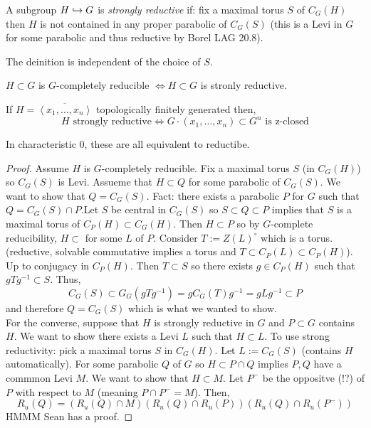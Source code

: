 \documentclass[12pt]{article}
\begin{document}
\begin{defn}
A subgroup $H \hookrightarrow G$ is \textit{strongly reductive} if: fix a maximal torus $S$ of $C_G(H)$ then $H$ is not contained in any proper parabolic of $C_G(S)$ (this is a Levi in $G$ for some parabolic and thus reductive by Borel LAG 20.8). 
\end{defn}

\begin{rmk}
The deinition is independent of the choice of $S$.
\end{rmk}

\begin{prop}
$H \subset G$ is $G$-completely reducible $\iff H \subset G$ is stronly reductive.
\end{prop}

If $H = \overline{\left< x_1, \dots, x_n \right>}$ topologically finitely generated then,
\[ H \text{ strongly reductive} \iff G \cdot (x_1, \dots, x_n) \subset G^n \text{ is z-closed} \]
\begin{rmk}
In characteristic $0$, these are all equivalent to reductibe. 
\end{rmk}

\begin{proof}
Assume $H$ is $G$-completely reducible. Fix a maximal torus $S$ (in $C_G(H)$) so $C_G(S)$ is Levi. Assueme that $H \subset Q$ for some parabolic of $C_G(S)$. We want to show that $Q = C_G(S)$. Fact: there exists a parabolic $P$ for $G$ such that $Q = C_G(S) \cap P$.Let $S$ be central in $C_G(S)$ so $S \subset Q \subset P$ implies that $S$ is a maximal torus of $C_P(H) \subset C_G(H)$. Then $H \subset P$ so by $G$-complete reducibility, $H \subset $ for some $L$ of $P$. Consider $T := Z(L)^\circ$ which is a torus. (reductive, solvable commutative implies a torus and $T \subset C_P(L) \subset C_P(H)$). Up to conjugacy in $C_P(H)$. Then $T \subset S$ so there exists $g \in C_P(H)$ such that $g T g^{-1} \subset S$. Thus,
\[ C_G(S) \subset G_G(g T g^{-1}) = g C_G(T) g^{-1} = g L g^{-1} \subset P \]
and therefore $Q = C_G(S)$ which is what we wanted to show. 
\bigskip\\
For the converse, suppose that $H$ is strongly reductive in $G$ and $P \subset G$ contains $H$. We want to show there exists a Levi $L$ such that $H \subset L$. To use strong reductivity: pick a maximal torus $S$ in $C_G(H)$. Let $L := C_G(S)$ (contains $H$ automatically). For some parabolic $Q$ of $G$ so $H \subset P \cap Q$ implies $P, Q$ have a commmon Levi $M$. We want to show that $H \subset M$. Let $P^{-}$ be the oppositve (!?) of $P$ with respect to $M$ (meaning $P \cap P^{-} = M$). Then,
\[ R_u(Q) = (R_u(Q) \cap M) (R_u(Q) \cap R_u(P)) (R_u(Q) \cap R_u(P^{-})) \]
HMMM Sean has a proof. 
\end{proof}
\end{document}
